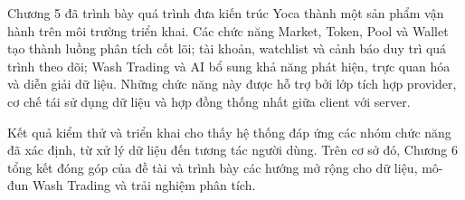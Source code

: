Chương 5 đã trình bày quá trình đưa kiến trúc Yoca thành một sản phẩm vận hành trên môi trường triển khai. Các chức năng Market, Token, Pool và Wallet tạo thành luồng phân tích cốt lõi; tài khoản, watchlist và cảnh báo duy trì quá trình theo dõi; Wash Trading và AI bổ sung khả năng phát hiện, trực quan hóa và diễn giải dữ liệu. Những chức năng này được hỗ trợ bởi lớp tích hợp provider, cơ chế tái sử dụng dữ liệu và hợp đồng thống nhất giữa client với server.

Kết quả kiểm thử và triển khai cho thấy hệ thống đáp ứng các nhóm chức năng đã xác định, từ xử lý dữ liệu đến tương tác người dùng. Trên cơ sở đó, Chương 6 tổng kết đóng góp của đề tài và trình bày các hướng mở rộng cho dữ liệu, mô-đun Wash Trading và trải nghiệm phân tích.
